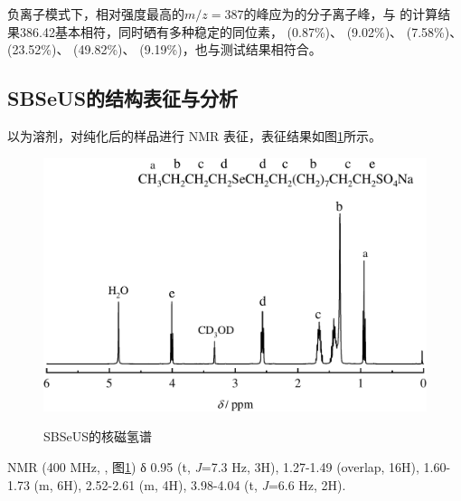 \documentclass[bachelor,winfonts,replaceperiod]{jnuthesis}
\begin{document}
    负离子模式下，相对强度最高的$m/z = 387$的峰应为的分子离子峰，与
    的计算结果386.42基本相符，同时硒有多种稳定的同位素， (0.87\%)、 (9.02\%)、 (7.58\%)、
     (23.52\%)、 (49.82\%)、 (9.19\%)，也与测试结果相符合。
    
    \subsection{SBSeUS的结构表征与分析}
        以为溶剂，对纯化后的样品进行     NMR 表征，表征结果如图\ref{fig:SBSeUS-nmr}所示。
    \begin{figure}[htbp]
        \centering
        \includegraphics[width=.7\textwidth]{figure/SBSeUS-nmr.pdf}\\
        \caption{SBSeUS的核磁氢谱}\label{fig:SBSeUS-nmr}
    \end{figure}
    
     NMR (400 MHz, , 图\ref{fig:SBSeUS-nmr}) δ 0.95 (t, \textit{J}=7.3 Hz, 3H), 1.27-1.49 (overlap, 16H), 
    1.60-1.73 (m, 6H), 2.52-2.61 (m, 4H), 3.98-4.04 (t, \textit{J}=6.6 Hz, 2H).
    
\end{document}
